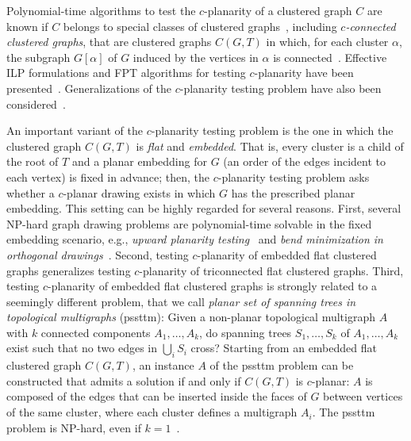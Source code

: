 \documentclass[letter,runningheads]{llncs}
\begin{document}
Polynomial-time algorithms to test the $c$-planarity of a clustered graph $C$ are known if $C$ belongs to special classes of clustered graphs~\cite{cw-cccg-06,cdpp-cccc-05,df-ectefcgsf-09,fce-pcg-95,d-ltarcgp-98,cdfpp-cccg-08,gls-cecg-05,gjlmpw-actcg-02,jkkpsv-scceg-09,jstv-cfoe-08}, including {\em $c$-connected clustered graphs}, that are clustered graphs $C(G,T)$ in which, for each cluster $\alpha$, the subgraph $G[\alpha]$ of $G$ induced by the vertices in $\alpha$ is connected~\cite{fce-pcg-95,d-ltarcgp-98,cdfpp-cccg-08}. Effective ILP formulations and FPT algorithms for testing $c$-planarity have been presented~\cite{cgjkm-ssscp-09,ck-ssscp-12}. Generalizations of the $c$-planarity testing problem have also been considered~\cite{addfpr-rccp-14,afp-scgc-09,dgl-ocp-08}.

An important variant of the $c$-planarity testing problem is the one in which the clustered graph $C(G,T)$ is {\em flat} and {\em embedded}. That is, every cluster is a child of the root of $T$ and a planar embedding for $G$ (an order of the edges incident to each vertex) is fixed in advance; then, the $c$-planarity testing problem asks whether a $c$-planar drawing exists in which $G$ has the prescribed planar embedding. This setting can be highly regarded for several reasons. First, several NP-hard graph drawing problems are polynomial-time solvable in the fixed embedding scenario, e.g., {\em upward planarity testing}~\cite{bdlm-udtd-94,GT01} and {\em bend minimization in orthogonal drawings}~\cite{t-eggmnb-87,GT01}. Second, testing $c$-planarity of embedded flat clustered graphs generalizes testing $c$-planarity of triconnected flat clustered graphs. Third, testing $c$-planarity of embedded flat clustered graphs is strongly related to a seemingly different problem, that we call {\em planar set of spanning trees in topological multigraphs} ({\sc pssttm}): Given a non-planar topological multigraph $A$ with $k$ connected components $A_1,\dots,A_k$, do spanning trees $S_1,\dots,S_k$ of $A_1,\dots,A_k$ exist such that no two edges in $\bigcup_i S_i$ cross? Starting from an embedded flat clustered graph $C(G,T)$, an instance $A$ of the {\sc pssttm} problem can be constructed that admits a solution if and only if $C(G,T)$ is $c$-planar: $A$ is composed of the edges that can be inserted inside the faces of $G$ between vertices of the same cluster, where each cluster defines a multigraph $A_i$. The {\sc pssttm} problem is NP-hard, even if $k=1$~\cite{kln-nstl-91}.
\end{document}

